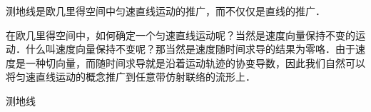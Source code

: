 

测地线是欧几里得空间中匀速直线运动的推广，而不仅仅是直线的推广．

在欧几里得空间中，如何确定一个匀速直线运动呢？当然是速度向量保持不变的运动．什么叫速度向量保持不变呢？那当然是速度随时间求导的结果为零咯．由于速度是一种切向量，而随时间求导就是沿着运动轨迹的协变导数，因此我们自然可以将匀速直线运动的概念推广到任意带仿射联络的流形上．

\begin{definition}{测地线}

\end{definition}






















